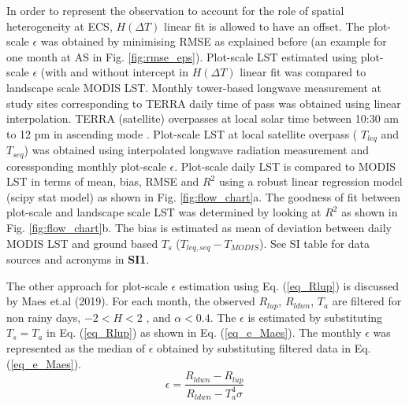 \documentclass[fleqn,10pt]{wlscirep}
\begin{document}
{In order to represent the observation to account for the role of spatial heterogeneity at ECS, $H(\Delta T)$ linear fit is allowed to have an offset. The plot-scale $\epsilon$ was obtained by minimising RMSE as explained before (an example for one month at AS in Fig. \ref{fig:rmse_eps}). Plot-scale LST estimated using plot-scale $\epsilon$ (with and without intercept in $H(\Delta T)$ linear fit was compared to landscape scale MODIS LST. Monthly tower-based longwave measurement at study sites corresponding to TERRA daily time of pass was obtained using linear interpolation. TERRA (satellite) overpasses at local solar time between 10:30 am to 12 pm in ascending mode \cite{guillevic2017land}. Plot-scale LST at local satellite overpass ( $T_{leq}$ and $T_{seq}$) was obtained using interpolated longwave radiation measurement and coressponding monthly plot-scale $\epsilon$. Plot-scale daily LST is compared to MODIS LST in terms of mean, bias, RMSE and $R^2$ using a robust linear regression model (scipy stat model) as shown in Fig. \ref{fig:flow_chart}a. The goodness of fit between plot-scale and landscape scale LST was determined by looking at $R^2$ as shown in Fig. \ref{fig:flow_chart}b. The bias is estimated as mean of deviation between daily MODIS LST and ground based $T_{s}$ ($T_{leq,seq} - T_{MODIS}$). See SI table for data sources and acronyms in \textbf{SI1}.

The other approach for plot-scale $\epsilon$ estimation using Eq. (\ref{eq_Rlup}) is discussed by Maes et.al (2019)\cite{maes2019potential}. For each month, the observed $R_{lup}$,  $R_{ldwn}$, $T_{a}$  are filtered for non rainy days, $-2 < H <2$ , and $\alpha < 0.4$. The $\epsilon$ is estimated by substituting $T_{s} = T_{a}$ in Eq. (\ref{eq_Rlup}) as shown in Eq. (\ref{eq_e_Maes}). The monthly $\epsilon$  was represented as the median of $\epsilon$ obtained by substituting filtered data in Eq. (\ref{eq_e_Maes}). 
\begin{equation}\label{eq_e_Maes}
\epsilon = \frac{R_{ldwn} - R_{lup}}{R_{ldwn} - T_{a}^{4} \sigma}
\end{equation}

}
\end{document}
